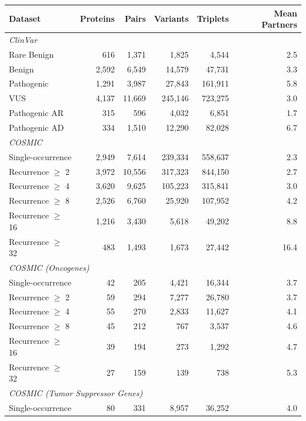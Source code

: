 \begin{tabular}{lrrrrr}
\hline
\textbf{Dataset} & \textbf{Proteins} & \textbf{Pairs} & \textbf{Variants} & \textbf{Triplets} & \textbf{Mean Partners} \\
\hline
\multicolumn{6}{l}{\textit{ClinVar}} \\
\quad Rare Benign & 616 & 1{,}371 & 1{,}825 & 4{,}544 & 2.5 \\
\quad Benign & 2{,}592 & 6{,}549 & 14{,}579 & 47{,}731 & 3.3 \\
\quad Pathogenic & 1{,}291 & 3{,}987 & 27{,}843 & 161{,}911 & 5.8 \\
\quad VUS & 4{,}137 & 11{,}669 & 245{,}146 & 723{,}275 & 3.0 \\
\quad Pathogenic AR & 315 & 596 & 4{,}032 & 6{,}851 & 1.7 \\
\quad Pathogenic AD & 334 & 1{,}510 & 12{,}290 & 82{,}028 & 6.7 \\
\hline
\multicolumn{6}{l}{\textit{COSMIC}} \\
\quad Single-occurrence & 2{,}949 & 7{,}614 & 239{,}334 & 558{,}637 & 2.3 \\
\quad Recurrence $\geq$ 2 & 3{,}972 & 10{,}556 & 317{,}323 & 844{,}150 & 2.7 \\
\quad Recurrence $\geq$ 4 & 3{,}620 & 9{,}625 & 105{,}223 & 315{,}841 & 3.0 \\
\quad Recurrence $\geq$ 8 & 2{,}526 & 6{,}760 & 25{,}920 & 107{,}952 & 4.2 \\
\quad Recurrence $\geq$ 16 & 1{,}216 & 3{,}430 & 5{,}618 & 49{,}202 & 8.8 \\
\quad Recurrence $\geq$ 32 & 483 & 1{,}493 & 1{,}673 & 27{,}442 & 16.4 \\
\hline
\multicolumn{6}{l}{\textit{COSMIC (Oncogenes)}} \\
\quad Single-occurrence & 42 & 205 & 4{,}421 & 16{,}344 & 3.7 \\
\quad Recurrence $\geq$ 2 & 59 & 294 & 7{,}277 & 26{,}780 & 3.7 \\
\quad Recurrence $\geq$ 4 & 55 & 270 & 2{,}833 & 11{,}627 & 4.1 \\
\quad Recurrence $\geq$ 8 & 45 & 212 & 767 & 3{,}537 & 4.6 \\
\quad Recurrence $\geq$ 16 & 39 & 194 & 273 & 1{,}292 & 4.7 \\
\quad Recurrence $\geq$ 32 & 27 & 159 & 139 & 738 & 5.3 \\
\hline
\multicolumn{6}{l}{\textit{COSMIC (Tumor Suppressor Genes)}} \\
\quad Single-occurrence & 80 & 331 & 8{,}957 & 36{,}252 & 4.0 \\

\end{tabular}
